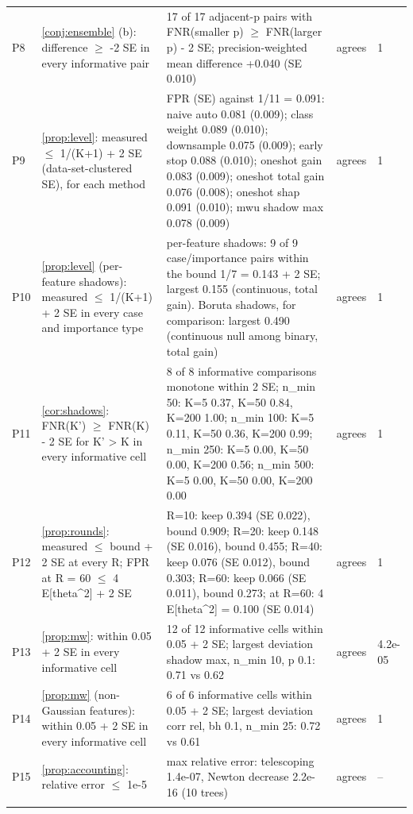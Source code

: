 \begin{longtable}{@{}l p{} p{} l l@{}}
\addlinespace
P8 & \raggedright \cref{conj:ensemble} (b): difference $\ge$ -2 SE in every informative pair & \raggedright 17 of 17 adjacent-p pairs with FNR(smaller p) $\ge$ FNR(larger p) - 2 SE; precision-weighted mean difference +0.040 (SE 0.010) & agrees & 1 \\
\addlinespace
P9 & \raggedright \cref{prop:level}: measured $\le$ 1/(K+1) + 2 SE (data-set-clustered SE), for each method & \raggedright FPR (SE) against 1/11 = 0.091: naive auto 0.081 (0.009); class weight 0.089 (0.010); downsample 0.075 (0.009); early stop 0.088 (0.010); oneshot gain 0.083 (0.009); oneshot total gain 0.076 (0.008); oneshot shap 0.091 (0.010); mwu shadow max 0.078 (0.009) & agrees & 1 \\
\addlinespace
P10 & \raggedright \cref{prop:level} (per-feature shadows): measured $\le$ 1/(K+1) + 2 SE in every case and importance type & \raggedright per-feature shadows: 9 of 9 case/importance pairs within the bound 1/7 = 0.143 + 2 SE; largest 0.155 (continuous, total gain). Boruta shadows, for comparison: largest 0.490 (continuous null among binary, total gain) & agrees & 1 \\
\addlinespace
P11 & \raggedright \cref{cor:shadows}: FNR(K') $\ge$ FNR(K) - 2 SE for K' > K in every informative cell & \raggedright 8 of 8 informative comparisons monotone within 2 SE; n\_min 50: K=5 0.37, K=50 0.84, K=200 1.00; n\_min 100: K=5 0.11, K=50 0.36, K=200 0.99; n\_min 250: K=5 0.00, K=50 0.00, K=200 0.56; n\_min 500: K=5 0.00, K=50 0.00, K=200 0.00 & agrees & 1 \\
\addlinespace
P12 & \raggedright \cref{prop:rounds}: measured $\le$ bound + 2 SE at every R; FPR at R = 60 $\le$ 4 E[theta\^{}2] + 2 SE & \raggedright R=10: keep 0.394 (SE 0.022), bound 0.909; R=20: keep 0.148 (SE 0.016), bound 0.455; R=40: keep 0.076 (SE 0.012), bound 0.303; R=60: keep 0.066 (SE 0.011), bound 0.273; at R=60: 4 E[theta\^{}2] = 0.100 (SE 0.014) & agrees & 1 \\
\addlinespace
P13 & \raggedright \cref{prop:mw}: within 0.05 + 2 SE in every informative cell & \raggedright 12 of 12 informative cells within 0.05 + 2 SE; largest deviation shadow max, n\_min 10, p 0.1: 0.71 vs 0.62 & agrees & 4.2e-05 \\
\addlinespace
P14 & \raggedright \cref{prop:mw} (non-Gaussian features): within 0.05 + 2 SE in every informative cell & \raggedright 6 of 6 informative cells within 0.05 + 2 SE; largest deviation corr rel, bh 0.1, n\_min 25: 0.72 vs 0.61 & agrees & 1 \\
\addlinespace
P15 & \raggedright \cref{prop:accounting}: relative error $\le$ 1e-5 & \raggedright max relative error: telescoping 1.4e-07, Newton decrease 2.2e-16 (10 trees) & agrees & -- \\
\addlinespace
\bottomrule
\end{longtable}
